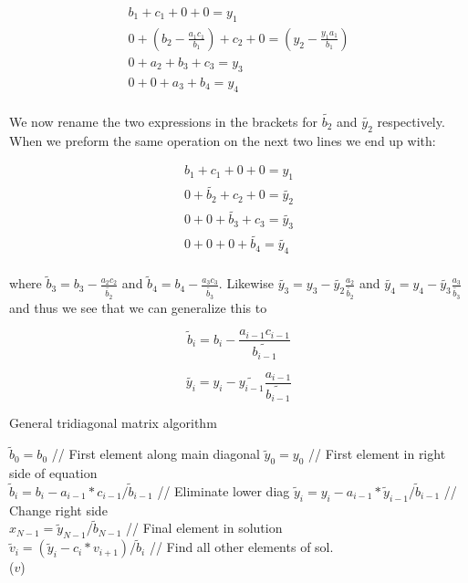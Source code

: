 \documentclass[12pt]{article}
\numberwithin{figure}{section}
\numberwithin{table}{section}
\begin{document}
\begin{align*}
b_1 + c_1  + 0 + 0 = y_1 \\
0 + (b_2 - \frac{a_1 c_1}{b_1}) + c_2 + 0 = (y_2 - \frac{y_1 a_1}{b_1}) \\
0 + a_2 + b_3 + c_3 = y_3 \\
0 + 0 + a_3 + b_4 = y_4\\
\end{align*}

\noindent We now rename the two expressions in the brackets for $\tilde{b_2}$ and $\tilde{y_2}$ respectively. When we preform the same operation on the next two lines we end up with:

\begin{align*}
b_1 + c_1  + 0 + 0 = y_1 \\
0 + \tilde{b_2} + c_2 + 0 = \tilde{y_2} \\
0 + 0 + \tilde{b_3} + c_3 = \tilde{y_3} \\
0 + 0 + 0 + \tilde{b_4} = \tilde{y_4} \\
\end{align*}

\noindent where $\tilde{b}_3= b_3 - \frac{a_2 c_2}{\tilde{b_2}}$ and $\tilde{b}_4= b_4 - \frac{a_3 c_3}{\tilde{b_3}}$. Likewise $\tilde{y_3} = y_3 - \tilde{y_2} \frac{a_2}{\tilde{b_2}}$ and $\tilde{y_4} = y_4 - \tilde{y_3} \frac{a_3}{\tilde{b_3}}$ and thus we see that we can generalize this to

\begin{equation}
 \tilde{b}_i= b_i - \frac{a_{i-1} c_{i-1}}{\tilde{b_{i-1}}} \label{genbi}
\end{equation}

\begin{equation}
\tilde{y_i} = y_i - \tilde{y_{i-1}} \frac{a_{i-1}}{\tilde{b_{i-1}}} \label{genyi}
\end{equation}

\begin{algorithm}
\caption{General tridiagonal matrix algorithm}\label{alg:tridiaggen}
\begin{algorithmic}[1]
	\State $\tilde{b}_0=b_0$ \qquad// First element along main diagonal
    \State $\tilde{y}_0=y_0$ \qquad// First element in right side of equation\\
		\State $\tilde{b}_i=b_i-a_{i-1}*c_{i-1}/\tilde{b}_{i-1}$		  \qquad// Eliminate lower diag
		\State $\tilde{y}_i=y_i-a_{i-1}*\tilde{y}_{i-1}/\tilde{b}_{i-1}$  \qquad// Change right side
	\EndFor \\
    
    \State $x_{N-1}=\tilde{y}_{N-1}/\tilde{b}_{N-1}$ \qquad\qquad// Final element in solution\\
    
		\State $\tilde{v}_i=(\tilde{y}_{i}-c_i*v_{i+1})/\tilde{b}_i$ \qquad// Find all other elements of sol.
	\EndFor \\
    
    \State \Return($v$)
\EndProcedure
\end{algorithmic}
\end{algorithm}
\end{document}
